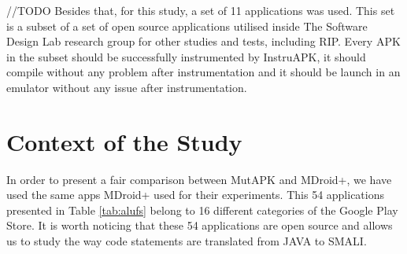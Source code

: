 //TODO
Besides that, for this study, a set of 11 applications was used. This set is a subset of a set of open source applications utilised inside The Software Design Lab research group for other studies and tests, including RIP. Every APK in the subset should be successfully instrumented by InstruAPK, it should compile without any problem after instrumentation and it should be launch in an emulator without any issue after instrumentation.


\section{Context of the Study}

In order to present a fair comparison between MutAPK and MDroid+, we have used the same apps MDroid+ used for their experiments. This 54 applications presented in Table \ref{tab:alufs} belong to 16 different categories of the Google Play Store. It is worth noticing that these 54 applications are open source and allows us to study the way code statements are translated from JAVA to SMALI.

